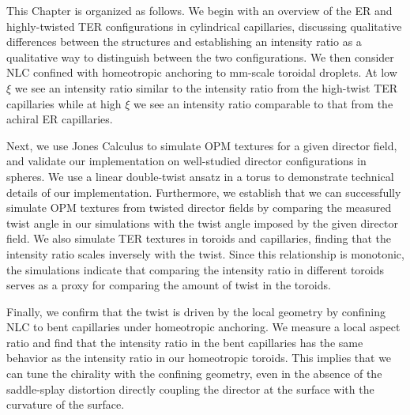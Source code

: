 This Chapter is organized as follows.
We begin with an overview of the ER and highly-twisted TER configurations in cylindrical capillaries, discussing qualitative differences between the structures and establishing an intensity ratio as a qualitative way to distinguish between the  two configurations.
We then consider NLC confined with homeotropic anchoring to mm-scale toroidal droplets.
At low $\xi$ we see an intensity ratio similar to the intensity ratio from the high-twist TER capillaries while at high $\xi$ we see an intensity ratio comparable to that from the achiral ER capillaries.

Next, we use Jones Calculus to simulate OPM textures for a given director field, and validate our implementation on well-studied director configurations in spheres.
We use a linear double-twist ansatz in a torus to demonstrate technical details of our implementation.
Furthermore, we establish that we can successfully simulate OPM textures from twisted director fields by comparing the measured twist angle in our simulations with the twist angle imposed by the given director field.
We also simulate TER textures in toroids and capillaries, finding that the intensity ratio scales inversely with the twist.
Since this relationship is monotonic, the simulations indicate that comparing the intensity ratio in different toroids serves as a proxy for comparing the amount of twist in the toroids.

Finally, we confirm that the twist is driven by the local geometry by confining NLC to bent capillaries under homeotropic anchoring.
We measure a local aspect ratio and find that the intensity ratio in the bent capillaries has the same behavior as the intensity ratio in our homeotropic toroids.
This implies that we can tune the chirality with the confining geometry, even in the absence of the saddle-splay distortion directly coupling the director at the surface with the curvature of the surface.




